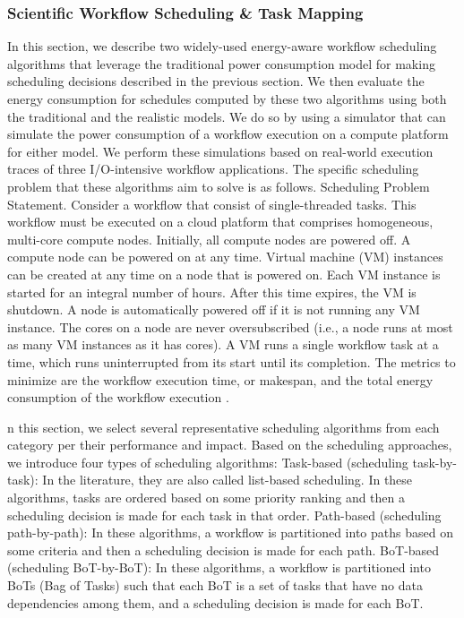 \subsubsection{Scientific Workflow Scheduling \& Task Mapping}
\label{sec:background_colocation_scheduling}
In this section, we describe two widely-used energy-aware workflow scheduling algorithms that leverage the traditional power consumption model for making scheduling decisions described in the previous section. We then evaluate the energy consumption for schedules computed by these two algorithms using both the traditional and the realistic models. We do so by using a simulator that can simulate the power consumption of a workflow execution on a compute platform for either model. We perform these simulations based on real-world execution traces of three I/O-intensive workflow applications. The specific scheduling problem that these algorithms aim to solve is as follows.
Scheduling Problem Statement. Consider a workflow that consist of single-threaded tasks. This workflow must be executed on a cloud platform that comprises homogeneous, multi-core compute nodes. Initially, all compute nodes are powered off. A compute node can be powered on at any time. Virtual machine (VM) instances can be created at any time on a node that is powered on. Each VM instance is started for an integral number of hours. After this time expires, the VM is shutdown. A node is automatically powered off if it is not running any VM instance. The cores on a node are never oversubscribed (i.e., a node runs at most as many VM instances as it has cores). A VM runs a single workflow task at a time, which runs uninterrupted from its start until its completion. The metrics to minimize are the workflow execution time, or makespan, and the total energy consumption of the workflow execution \cite{HosseiniShirvani2024}.

n this section, we select several representative scheduling algorithms from each category per their performance and impact. Based on the scheduling approaches, we introduce four types of scheduling algorithms:
Task-based (scheduling task-by-task): In the literature, they are also called list-based scheduling. In these algorithms, tasks are ordered based on some priority ranking and then a scheduling decision is made for each task in that order. Path-based (scheduling path-by-path): In these algorithms, a workflow is partitioned into paths based on some criteria and then a scheduling decision is made for each path.
BoT-based (scheduling BoT-by-BoT): In these algorithms, a workflow is partitioned into BoTs (Bag of Tasks) such that each BoT is a set of tasks that have no data dependencies among them, and a scheduling decision is made for each BoT.

